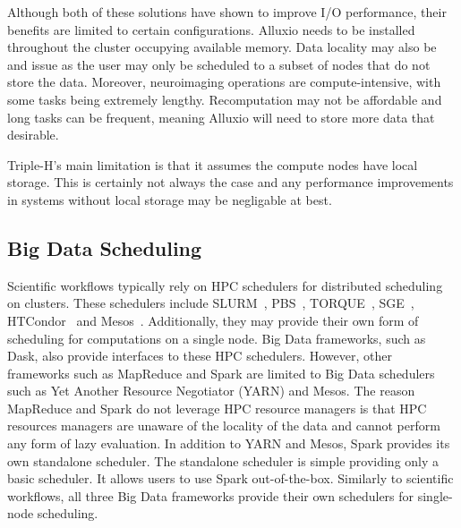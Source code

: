                 Although both of these solutions have shown to improve I/O
                performance, their benefits are limited to certain 
                configurations. Alluxio needs to be installed throughout the 
                cluster occupying available memory. Data locality may also be
                and issue as the user may only be scheduled to a subset of
                nodes that do not store the data. Moreover, neuroimaging 
                operations are compute-intensive, with some tasks being 
                extremely lengthy. Recomputation may not be affordable and long
                tasks can be frequent, meaning Alluxio will need to store more 
                data that desirable.

                Triple-H's main limitation is that it assumes the compute nodes
                have local storage. This is certainly not always the case and
                any performance improvements in systems without local storage 
                may be negligable at best.   
            
        \subsection{Big Data Scheduling}\label{sched}
            
            Scientific workflows typically rely on HPC schedulers for 
            distributed scheduling on clusters. These schedulers include 
            SLURM~\cite{yoo2003slurm},
            PBS~\cite{10.1007/3-540-60153-8_34}, 
            TORQUE~\cite{computing2015torque}, 
            SGE~\cite{SGE}, HTCondor~\cite{htcondor} and 
            Mesos~\cite{hindman2011mesos}. Additionally, they may provide
            their own form of scheduling for computations on a single node. 
            Big Data frameworks, such as Dask,
            also provide interfaces to these HPC schedulers. However, other
            frameworks such as MapReduce and Spark are limited to Big Data 
            schedulers such as Yet Another Resource Negotiator (YARN) and Mesos.
            The reason MapReduce and Spark do not leverage HPC resource managers
            is that HPC resources managers are unaware of the locality of the 
            data and cannot perform any form of lazy evaluation.
            In addition to YARN and Mesos, Spark provides its own standalone 
            scheduler. The standalone scheduler is simple providing only a 
            basic scheduler. It allows users to use Spark out-of-the-box. Similarly
            to scientific workflows, all three Big Data frameworks provide their
            own schedulers for single-node scheduling.

